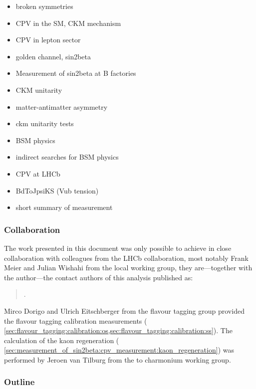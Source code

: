 \begin{itemize}
  \item broken symmetries
  \item CPV in the SM, CKM mechanism
  \item CPV in lepton sector
  \item golden channel, sin2beta
  \item Measurement of sin2beta at B factories
  \item CKM unitarity
  \item matter-antimatter asymmetry
  \item ckm unitarity tests
  \item BSM physics
  \item indirect searches for BSM physics
  \item CPV at LHCb
  \item BdToJpsiKS (Vub tension)
  \item short summary of measurement
\end{itemize}

\subsubsection*{Collaboration}
The work presented in this document was only possible to achieve in close
collaboration with colleagues from the \acs{LHCb} collaboration, most notably
Frank Meier and Julian Wishahi from the local working group, they are---together
with the author---the contact authors of this analysis published as:
%
\begin{quotation}
  .
\end{quotation}

Mirco Dorigo and Ulrich Eitschberger from the flavour tagging group provided the
flavour tagging calibration measurements (\cf
\cref{sec:flavour_tagging:calibration:os,sec:flavour_tagging:calibration:ss}).
The calculation of the kaon regeneration (\cf
\cref{sec:measurement_of_sin2beta:cpv_measurement:kaon_regeneration}) was
performed by Jeroen van Tilburg from the \B to charmonium working group.

\subsubsection*{Outline}

